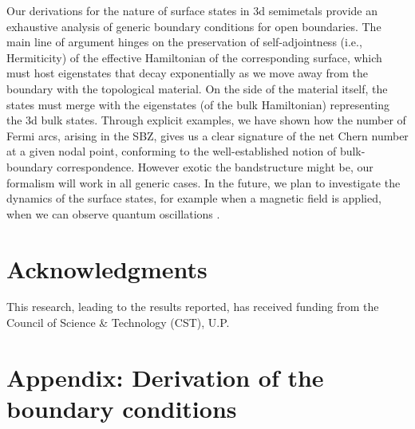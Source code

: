 \documentclass[aps,prb,onecolumn, footinbib, 10pt]{revtex4-2}
\begin{document}
Our derivations for the nature of surface states in 3d semimetals provide an exhaustive analysis of generic boundary conditions for open boundaries. The main line of argument hinges on the preservation of self-adjointness (i.e., Hermiticity) of the effective Hamiltonian of the corresponding surface, which must host eigenstates that decay exponentially as we move away from the boundary with the topological material. On the side of the material itself, the states must merge with the eigenstates (of the bulk Hamiltonian) representing the 3d bulk states. Through explicit examples, we have shown how the number of Fermi arcs, arising in the SBZ, gives us a clear signature of the net Chern number at a given nodal point, conforming to the well-established notion of bulk-boundary correspondence. However exotic the bandstructure might be, our formalism will work in all generic cases. In the future, we plan to investigate the dynamics of the surface states, for example when a magnetic field is applied, when we can observe quantum oscillations \cite{qtm-osc-ashvin, hosur-arc-osc}.




\section*{Acknowledgments}

This research, leading to the results reported, has received funding from the Council of Science \& Technology (CST), U.P.

\appendix

\section*{Appendix: Derivation of the boundary conditions}
\end{document}
